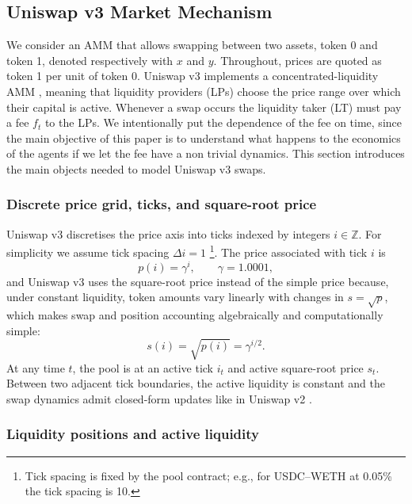 \documentclass[11pt]{article}
\begin{document}
\subsection{Uniswap v3 Market Mechanism}
\label{subsec:univ3}

We consider an AMM that allows swapping between two assets, token 0 and token 1, denoted respectively with $x$ and $y$. Throughout, prices are quoted as token 1 per unit of token 0. Uniswap v3 implements a concentrated-liquidity AMM \cite{adams2021}, meaning that liquidity providers (LPs) choose the price range over which their capital is active. Whenever a swap occurs
the liquidity taker (LT) must pay a fee $f_t$ to the LPs. We intentionally put the dependence of the fee on time, since the main objective of this paper is to understand what happens to the economics of the agents if we let the fee have a non trivial dynamics. This section introduces the main objects needed to model Uniswap v3 swaps.

\subsubsection{Discrete price grid, ticks, and square-root price}

Uniswap v3 discretises the price axis into ticks indexed by integers $i \in \mathbb{Z}$.
For simplicity we assume tick spacing $\Delta i = 1$
\footnote{Tick spacing is fixed by the pool contract; e.g., for USDC--WETH at 0.05\% the tick spacing is 10.}.
The price associated with tick $i$ is
\begin{equation}
  p(i) = \gamma^{i}, \qquad \gamma = 1.0001,
\end{equation}
and Uniswap v3 uses the square-root price instead of the simple price because, under constant liquidity, token amounts vary linearly with 
changes in \(s=\sqrt{p}\), which makes swap and position accounting algebraically and computationally simple:
\begin{equation}
  s(i) = \sqrt{p(i)} = \gamma^{i/2}.
\end{equation}
At any time $t$, the pool is at an active tick $i_t$ and active square-root price $s_t$. Between two adjacent tick boundaries, the active liquidity is constant and the swap dynamics admit closed-form updates like in Uniswap v2 \cite{Adams2020UniswapVC}.

\subsubsection{Liquidity positions and active liquidity}
\end{document}
